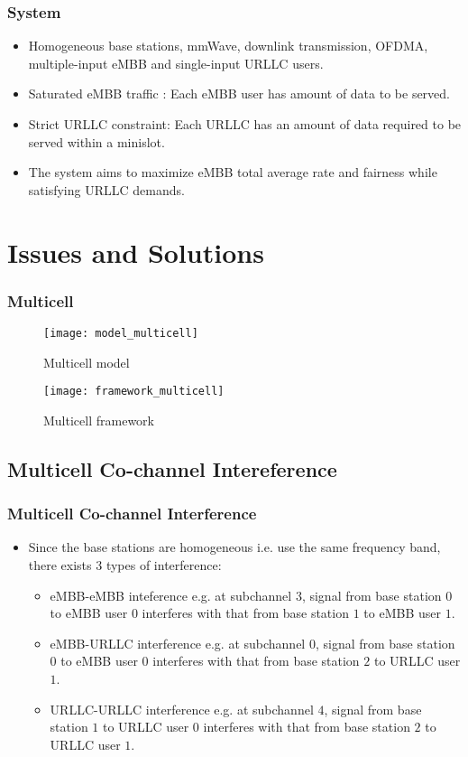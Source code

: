 \begin{frame}
  \frametitle{System}
  \begin{itemize}
    \item Homogeneous base stations, mmWave, downlink transmission, OFDMA, multiple-input eMBB and single-input URLLC users.
    \item Saturated eMBB traffic \cite{S05}: Each eMBB user has  amount of data to be served.
    \item Strict URLLC constraint: Each URLLC has an amount of data required to be served within a minislot.
    \item The system aims to maximize eMBB total average rate and fairness while satisfying URLLC demands.
  \end{itemize}
\end{frame}

\section{Issues and Solutions}
\begin{frame}
  \frametitle{Multicell}
  \begin{figure}
    \texttt{[image: model\_multicell]}
    \caption{Multicell model}
  \end{figure}
\end{frame}

\begin{frame}
  \begin{figure}
    \texttt{[image: framework\_multicell]}
    \caption{Multicell framework}
  \end{figure}
\end{frame}

\subsection{Multicell Co-channel Intereference}
\begin{frame}
  \frametitle{Multicell Co-channel Interference}
  \begin{itemize}
    \item Since the base stations are homogeneous i.e. use the same frequency band, there exists 3 types of interference:
      \begin{itemize}
        \item eMBB-eMBB inteference e.g. at subchannel $3$, signal from base station $0$ to eMBB user $0$ interferes with that from base station $1$ to eMBB user $1$.
        \item eMBB-URLLC interference e.g. at subchannel $0$, signal from base station $0$ to eMBB user $0$ interferes with that from base station $2$ to URLLC user $1$.
        \item URLLC-URLLC interference e.g. at subchannel $4$, signal from base station $1$ to URLLC user $0$ interferes with that from base station $2$ to URLLC user $1$.
      \end{itemize}
  \end{itemize}
\end{frame}

